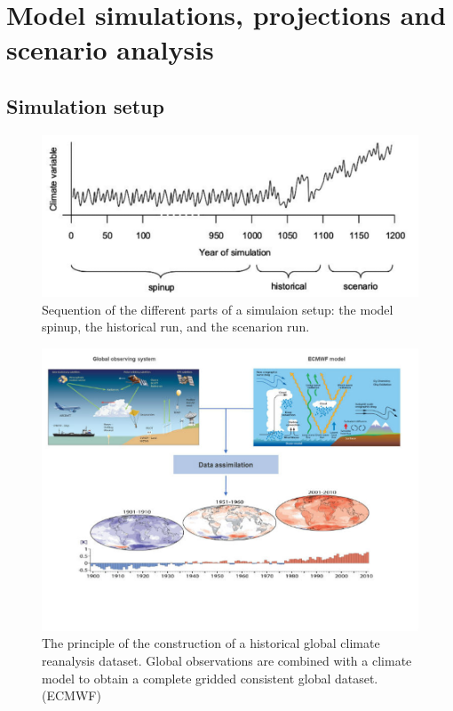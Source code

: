 \documentclass[12pt,oneside]{book}
\begin{document}
\chapter{Model simulations, projections and scenario
analysis}\label{model-simulations-projections-and-scenario-analysis}


\section{Simulation setup}\label{simulation-setup}

\begin{figure}

{\centering \includegraphics[width=0.8\linewidth]{figures/chap10/f10_1_simu} 

}

\caption{Sequention of the different parts of a simulaion setup: the model spinup, the historical run, and the scenarion run.}\label{fig:f101}
\end{figure}

\begin{figure}

{\centering \includegraphics[width=0.8\linewidth]{figures/chap10/f10_2_ECMWF} 

}

\caption{The principle of the construction of a historical global climate reanalysis dataset. Global observations are combined with a climate model to obtain a complete gridded consistent global dataset. (ECMWF) }\label{fig:f102}
\end{figure}
\end{document}
